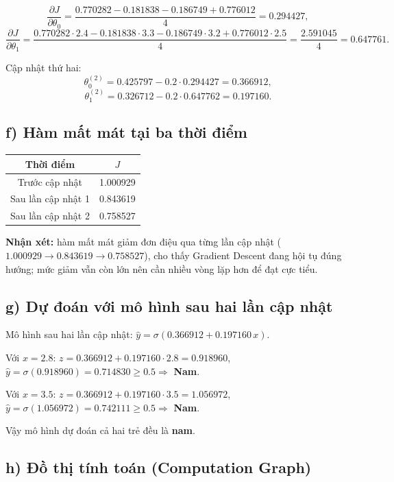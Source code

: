 \documentclass[a4paper,12pt]{article}
\begin{document}
\[ \frac{\partial J}{\partial\theta_0}
= \frac{0.770282-0.181838-0.186749+0.776012}{4} = 0.294427, \]
\[ \frac{\partial J}{\partial\theta_1}
= \frac{0.770282\cdot2.4 -0.181838\cdot3.3 -0.186749\cdot3.2 +0.776012\cdot2.5}{4}
= \frac{2.591045}{4} = 0.647761. \]

Cập nhật thứ hai:
\[ \theta_0^{(2)} = 0.425797 - 0.2\cdot 0.294427 = 0.366912, \]
\[ \theta_1^{(2)} = 0.326712 - 0.2\cdot 0.647762 = 0.197160. \]

\subsection*{f) Hàm mất mát tại ba thời điểm}

\begin{center}
\begin{tabular}{|c|c|}
\hline
Thời điểm & $J$ \\
\hline
Trước cập nhật & 1.000929 \\
Sau lần cập nhật 1 & 0.843619 \\
Sau lần cập nhật 2 & 0.758527 \\
\hline
\end{tabular}
\end{center}

\textbf{Nhận xét:} hàm mất mát giảm đơn điệu qua từng lần cập nhật
($1.000929 \to 0.843619 \to 0.758527$), cho thấy Gradient Descent đang hội tụ đúng hướng;
mức giảm vẫn còn lớn nên cần nhiều vòng lặp hơn để đạt cực tiểu.

\subsection*{g) Dự đoán với mô hình sau hai lần cập nhật}

Mô hình sau hai lần cập nhật: $\hat{y} = \sigma(0.366912 + 0.197160\,x)$.

Với $x = 2.8$: $z = 0.366912 + 0.197160\cdot 2.8 = 0.918960$,
$\hat{y} = \sigma(0.918960) = 0.714830 \geq 0.5 \Rightarrow$ \textbf{Nam}.

Với $x = 3.5$: $z = 0.366912 + 0.197160\cdot 3.5 = 1.056972$,
$\hat{y} = \sigma(1.056972) = 0.742111 \geq 0.5 \Rightarrow$ \textbf{Nam}.

Vậy mô hình dự đoán cả hai trẻ đều là \textbf{nam}.

\subsection*{h) Đồ thị tính toán (Computation Graph)}
\end{document}
